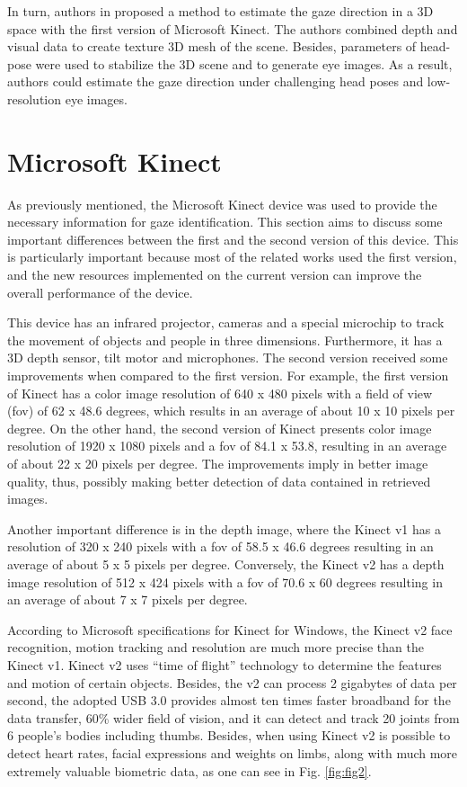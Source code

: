\documentclass[10pt, conference]{IEEEtran}
\begin{document}
	In turn, authors in \cite{10} proposed a method to estimate the gaze direction in a 3D space with the first version of Microsoft Kinect. 
	The authors combined depth and visual data to create texture 3D mesh of the scene. 
	Besides, parameters of head-pose were used to stabilize the 3D scene and to generate eye images. 
	As a result, authors could estimate the gaze direction under challenging head poses and low-resolution eye images.

\section{Microsoft Kinect} \label{sec:technologyUsed}
    
	As previously mentioned, the Microsoft Kinect device was used to provide the necessary information for gaze identification.
	This section aims to discuss some important differences between the first and the second version of this device.
	This is particularly important because most of the related works used the first version, and the new resources implemented on the current version can improve the overall performance of the device.

	This device has an infrared projector, cameras and a special microchip to track the movement of objects and people in three dimensions. 
	Furthermore, it has a 3D depth sensor, tilt motor and microphones.
	The second version received some improvements when compared to the first version. 
	For example, the first version of Kinect has a color image resolution of 640 x 480 pixels with a field of view (fov) of 62 x 48.6 degrees, which results in an average of about 10 x 10 pixels per degree. 
	On the other hand, the second version of Kinect presents color image resolution of 1920 x 1080 pixels and a fov of 84.1 x 53.8, resulting in an average of about 22 x 20 pixels per degree. 
	The improvements imply in better image quality, thus, possibly making better detection of data contained in retrieved images.

	Another important difference is in the depth image, where the Kinect v1 has a resolution of 320 x 240 pixels with a fov of 58.5 x 46.6 degrees resulting in an average of about 5 x 5 pixels per degree. 
	Conversely, the Kinect v2 has a depth image resolution of 512 x 424 pixels with a fov of 70.6 x 60 degrees resulting in an average of about 7 x 7 pixels per degree. 

	According to Microsoft specifications for Kinect for Windows, the Kinect v2 face recognition, motion tracking and resolution are much more precise than the Kinect v1. 
    Kinect v2 uses ``time of flight'' technology to determine the features and motion of certain objects. 
	Besides, the v2 can process 2 gigabytes of data per second, the adopted USB 3.0 provides almost ten times faster broadband for the data transfer, 60\% wider field of vision, and it can detect and track 20 joints from 6 people’s bodies including thumbs. 
	Besides, when using Kinect v2 is possible to detect heart rates, facial expressions and weights on limbs, along with much more extremely valuable biometric data, as one can see in Fig. \ref{fig:fig2}.
\end{document}
